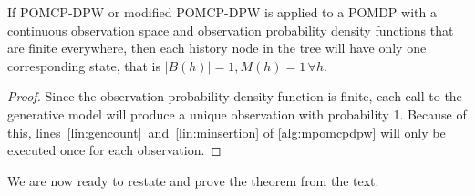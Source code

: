 \begin{lemma} \label{lem:onestate}
    If POMCP-DPW or modified POMCP-DPW is applied to a POMDP with a continuous observation space and observation probability density functions that are finite everywhere, then each history node in the tree will have only one corresponding state, that is $|B(h)| = 1, M(h)=1\, \forall h$.
\end{lemma}

\begin{proof}
    Since the observation probability density function is finite, each call to the generative model will produce a unique observation with probability 1.
    Because of this, lines~\ref{lin:gencount}~and~\ref{lin:minsertion} of \cref{alg:mpomcpdpw} will only be executed once for each observation.
\end{proof}

We are now ready to restate and prove the theorem from the text.


\qmdp*

